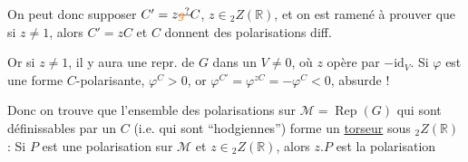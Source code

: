  On peut donc supposer $C'=z\deleted{\unsure{g}}C$, $z\in {}_2Z(\mathbb R)$, et on est ramené à prouver que si $z\ne1$, alors $C'=zC$ et $C$ donnent des polarisations diff.

Or si $z\ne1$, il y aura une repr. de $G$ dans un $V\ne0$, où $z$ opère par $-\mathrm{id}_V$. Si $\varphi$ est une forme $C$-polarisante, $\varphi^C>0$, or $\varphi^{C'}=\varphi^{zC}=-\varphi^C<0$, absurde !

Donc on trouve que l'ensemble des polarisations sur $\mathcal M=\operatorname{Rep}(G)$ qui sont définissables par un $C$ (i.e. qui sont ``hodgiennes'') forme un \uline{torseur} sous $ {}_2Z(\mathbb R)$ : Si  $P$ est une polarisation sur $\mathcal M$ et $z\in {}_2Z(\mathbb R)$, alors $z.P$ est la polarisation

